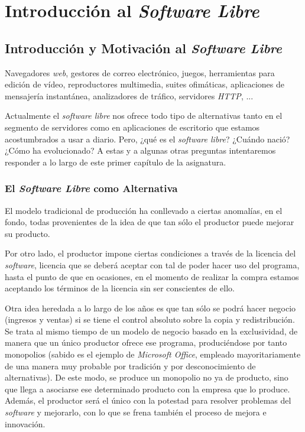 \chapter{Introducción al \textit{Software Libre}}
\label{CHAP1:Introduction}
\section{Introducción y Motivación al \textit{Software Libre}}

Navegadores \textit{web}, gestores de correo electrónico, juegos, herramientas
para edición de vídeo, reproductores multimedia, suites ofimáticas, aplicaciones
de mensajería instantánea, analizadores de tráfico, servidores \textit{HTTP},
...

Actualmente el \textit{software libre} nos ofrece todo tipo de alternativas
tanto en el segmento de servidores como en aplicaciones de escritorio que
estamos acostumbrados a usar a diario. Pero, ¿qué es el \textit{software libre}?
¿Cuándo nació? ¿Cómo ha evolucionado? A estas y a algunas otras preguntas
intentaremos responder a lo largo de este primer capítulo de la asignatura.

\subsection{El \textit{Software Libre} como Alternativa}

El modelo tradicional de producción ha conllevado a ciertas anomalías, en el
fondo, todas provenientes de la idea de que tan sólo el productor puede mejorar
su producto.

Por otro lado, el productor impone ciertas condiciones a través de
la licencia del \textit{software}, licencia que se deberá aceptar con tal de
poder hacer uso del programa, hasta el punto de que en ocasiones, en el momento
de realizar la compra estamos aceptando los términos de la licencia sin ser
conscientes de ello.

Otra idea heredada a lo largo de los años es que tan sólo se podrá hacer
negocio (ingresos y ventas) si se tiene el control absoluto sobre la copia y
redistribución. Se trata al mismo tiempo de un modelo de negocio basado en la
exclusividad, de manera que un único productor ofrece ese programa,
produciéndose por tanto monopolios (sabido es el ejemplo de \textit{Microsoft
Office}, empleado mayoritariamente de una manera muy probable por tradición y
por desconocimiento de alternativas). De este modo, se produce un
monopolio no ya de producto, sino que llega a asociarse ese determinado
producto con la empresa que lo produce. Además, el productor será el único con
la potestad para resolver problemas del \textit{software} y mejorarlo, con lo
que se frena también el proceso de mejora e innovación.

